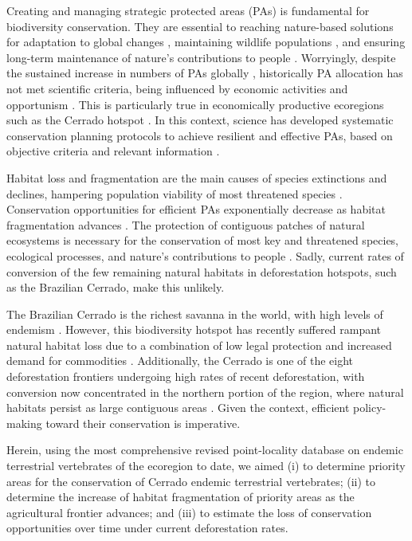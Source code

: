 \documentclass[12pt,openright,oneside,a4paper,english]{abntex2}
\begin{document}
Creating and managing strategic protected areas (PAs) is fundamental for biodiversity conservation. They are essential to reaching nature-based solutions for adaptation to global changes \citep{Maxwell2020}, maintaining wildlife populations \citep{Geldmann2013}, and ensuring long-term maintenance of nature’s contributions to people \citep{Diaz2018}. Worryingly, despite the sustained increase in numbers of PAs globally \citep{Maxwell2020}, historically PA allocation has not met scientific criteria, being influenced by economic activities and opportunism \citep{Margules2000}. This is particularly true in economically productive ecoregions \citep{PrietoTorres2022} such as the Cerrado hotspot \citep{Strassburg2017, Vieira2019}. In this context, science has developed systematic conservation planning protocols to achieve resilient and effective PAs, based on objective criteria and relevant information \citep{Margules2000, DiMinin2014}.

Habitat loss and fragmentation are the main causes of species extinctions and declines, hampering population viability of most threatened species \citep{IPBES2019, Grande2020}. Conservation opportunities for efficient PAs exponentially decrease as habitat fragmentation advances \citep{Nori2013}. The protection of contiguous patches of natural ecosystems is necessary for the conservation of most key and threatened species, ecological processes, and nature’s contributions to people \citep{Diaz2018}. Sadly, current rates of conversion of the few remaining natural habitats in deforestation hotspots, such as the Brazilian Cerrado, make this unlikely.

The Brazilian Cerrado is the richest savanna in the world, with high levels of endemism \citep{Strassburg2017}. However, this biodiversity hotspot has recently suffered rampant natural habitat loss due to a combination of low legal protection and increased demand for commodities \citep{Pacheco2021}. Additionally, the Cerrado is one of the eight deforestation frontiers undergoing high rates of recent deforestation, with conversion now concentrated in the northern portion of the region, where natural habitats persist as large contiguous areas \citep{Strassburg2017}. Given the context, efficient policy-making toward their conservation is imperative.

Herein, using the most comprehensive revised point-locality database on endemic terrestrial vertebrates of the ecoregion to date, we aimed (i) to determine priority areas for the conservation of Cerrado endemic terrestrial vertebrates; (ii) to determine the increase of habitat fragmentation of priority areas as the agricultural frontier advances; and (iii) to estimate the loss of conservation opportunities over time under current deforestation rates.
\end{document}

